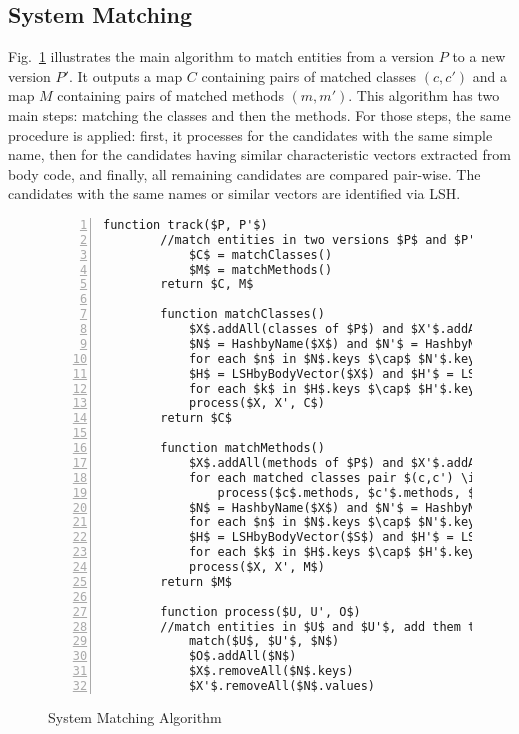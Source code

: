 
\subsection{System Matching}


Fig.~\ref{matching} illustrates the main algorithm to match entities
from a version $P$ to a new version $P'$. It outputs a map $C$
containing pairs of matched classes $(c,c')$ and a map $M$ containing
pairs of matched methods $(m,m')$. This algorithm has two main steps:
matching the classes and then the methods. For those steps, the same
procedure is applied: first, it processes for the
candidates with the same simple name, then for the candidates having
similar characteristic vectors extracted from body code, and finally,
all remaining candidates are compared pair-wise. The candidates with the
same names or similar vectors are identified via LSH.

\begin{figure}
\begin{lstlisting}[stepnumber=1,numbers=left,numbersep=-5pt]
		function track($P, P'$)
		//match entities in two versions $P$ and $P'$ to two maps $C$ and $M$
			$C$ = matchClasses()
			$M$ = matchMethods()
		return $C, M$
		
		function matchClasses()
			$X$.addAll(classes of $P$) and $X'$.addAll(classes of $P'$)
			$N$ = HashbyName($X$) and $N'$ = HashbyName($X'$)
			for each $n$ in $N$.keys $\cap$ $N'$.keys: process($N(n), N'(n), C$)
			$H$ = LSHbyBodyVector($X$) and $H'$ = LSHbyBodyVector($X'$)
			for each $k$ in $H$.keys $\cap$ $H'$.keys: process($H(k), H'(k), C$)
			process($X, X', C$)
		return $C$
		
		function matchMethods()
			$X$.addAll(methods of $P$) and $X'$.addAll(methods of $P'$)
			for each matched classes pair $(c,c') \in C$:
				process($c$.methods, $c'$.methods, $M$)
			$N$ = HashbyName($X$) and $N'$ = HashbyName($X'$)
			for each $n$ in $N$.keys $\cap$ $N'$.keys: process($N(n), N'(n), M$)
			$H$ = LSHbyBodyVector($S$) and $H'$ = LSHbyBodyVector($S'$)
			for each $k$ in $H$.keys $\cap$ $H'$.keys: process($H(k), H'(k), M$)
			process($X, X', M$)
		return $M$
		
		function process($U, U', O$)
		//match entities in $U$ and $U'$, add them to the map of matched entities $O$, and remove them from the remaining sets.
			match($U$, $U'$, $N$)
			$O$.addAll($N$)
			$X$.removeAll($N$.keys)
			$X'$.removeAll($N$.values)
\end{lstlisting}
\caption{System Matching Algorithm}
\label{matching}
\end{figure}

